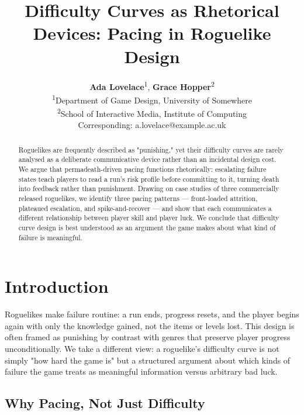 \documentclass[blue,fullpaper]{ludusofficial}
\title{Difficulty Curves as Rhetorical Devices: Pacing in Roguelike Design}
\author{%
    \textbf{Ada Lovelace}\textsuperscript{1}, \textbf{Grace Hopper}\textsuperscript{2}\\[0.2cm]
    \mdseries\small\textsuperscript{1}Department of Game Design, University of Somewhere\\
    \small\textsuperscript{2}School of Interactive Media, Institute of Computing\\
    \small Corresponding: a.lovelace@example.ac.uk
}
\begin{document}
\begin{abstract}
Roguelikes are frequently described as "punishing," yet their difficulty
curves are rarely analysed as a deliberate communicative device rather than
an incidental design cost. We argue that permadeath-driven pacing functions
rhetorically: escalating failure states teach players to read a run's risk
profile before committing to it, turning death into feedback rather than
punishment. Drawing on case studies of three commercially released
roguelikes, we identify three pacing patterns — front-loaded attrition,
plateaued escalation, and spike-and-recover — and show that each
communicates a different relationship between player skill and player luck.
We conclude that difficulty curve design is best understood as an argument
the game makes about what kind of failure is meaningful.
\end{abstract}


\maketitle

\section{Introduction}

Roguelikes make failure routine: a run ends, progress resets, and the player
begins again with only the knowledge gained, not the items or levels lost.
This design is often framed as punishing by contrast with genres that
preserve player progress unconditionally. We take a different view: a
roguelike's difficulty curve is not simply "how hard the game is" but a
structured argument about which kinds of failure the game treats as
meaningful information versus arbitrary bad luck.

\subsection{Why Pacing, Not Just Difficulty}
\end{document}
